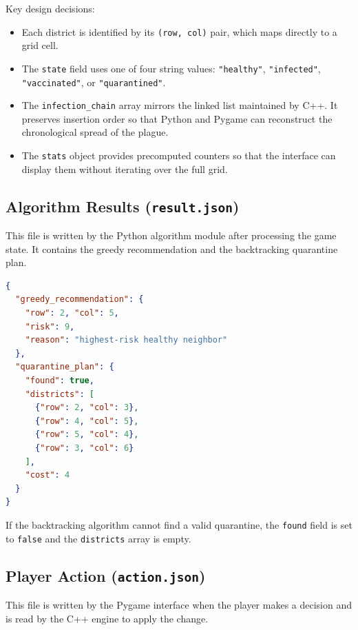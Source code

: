 \documentclass[conference]{IEEEtran}
\begin{document}
Key design decisions:

\begin{itemize}
    \item Each district is identified by its \texttt{(row, col)} pair, which
          maps directly to a grid cell.
    \item The \texttt{state} field uses one of four string values:
          \texttt{"healthy"}, \texttt{"infected"}, \texttt{"vaccinated"}, or
          \texttt{"quarantined"}.
    \item The \texttt{infection\_chain} array mirrors the linked list
          maintained by C++. It preserves insertion order so that Python and
          Pygame can reconstruct the chronological spread of the plague.
    \item The \texttt{stats} object provides precomputed counters so that the
          interface can display them without iterating over the full grid.
\end{itemize}

\subsection{Algorithm Results (\texttt{result.json})}

This file is written by the Python algorithm module after processing the game
state. It contains the greedy recommendation and the backtracking quarantine
plan.

\begin{lstlisting}[language=json, frame=single,
  caption={Example \texttt{result.json}.},
  label={lst:result}]
{
  "greedy_recommendation": {
    "row": 2, "col": 5,
    "risk": 9,
    "reason": "highest-risk healthy neighbor"
  },
  "quarantine_plan": {
    "found": true,
    "districts": [
      {"row": 2, "col": 3},
      {"row": 4, "col": 5},
      {"row": 5, "col": 4},
      {"row": 3, "col": 6}
    ],
    "cost": 4
  }
}
\end{lstlisting}

If the backtracking algorithm cannot find a valid quarantine, the
\texttt{found} field is set to \texttt{false} and the \texttt{districts} array
is empty.

\subsection{Player Action (\texttt{action.json})}

This file is written by the Pygame interface when the player makes a decision
and is read by the C++ engine to apply the change.
\end{document}
